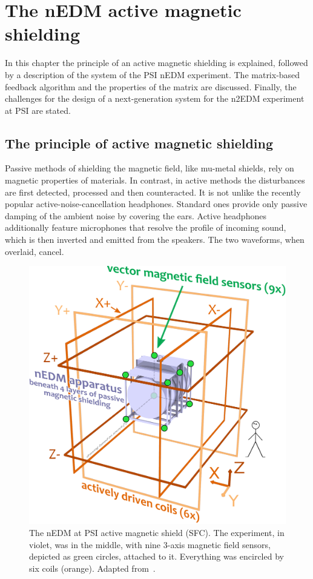 \chapter{The nEDM active magnetic shielding}

\label{ch:nedm_sfc}
In this chapter the principle of an active magnetic shielding is explained, followed by a description of the system of the PSI nEDM experiment. The matrix-based feedback algorithm and the properties of the matrix are discussed. Finally, the challenges for the design of a next-generation system for the n2EDM experiment at PSI are stated.




\section{The principle of active magnetic shielding}
Passive methods of shielding the magnetic field, like mu-metal shields, rely on magnetic properties of materials. In contrast, in active methods the disturbances are first detected, processed and then counteracted. It is not unlike the recently popular active-noise-cancellation headphones. Standard ones provide only passive damping of the ambient noise by covering the ears. Active headphones additionally feature microphones that resolve the profile of incoming sound, which is then inverted and emitted from the speakers. The two waveforms, when overlaid, cancel.

\begin{figure}
  \centering
  \includegraphics[width=0.8\linewidth]{gfx/nEDM_SFC/SFC_scheme.pdf}
  \caption{The nEDM at PSI active magnetic shield (SFC). The experiment, in violet, was in the middle, with nine 3-axis magnetic field sensors, depicted as green circles, attached to it. Everything was encircled by six coils (orange). Adapted from~\cite{Franke2013}.}\label{fig:sfc-scheme}
\end{figure}

